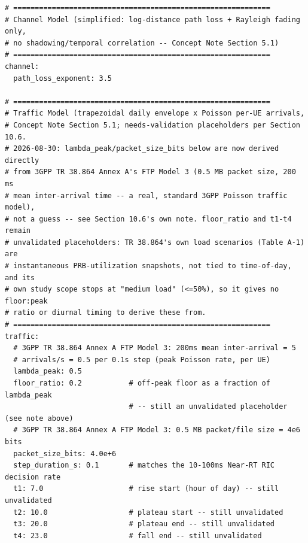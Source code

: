 {\begin{verbatim}
# ============================================================
# Channel Model (simplified: log-distance path loss + Rayleigh fading only,
# no shadowing/temporal correlation -- Concept Note Section 5.1)
# ============================================================
channel:
  path_loss_exponent: 3.5

# ============================================================
# Traffic Model (trapezoidal daily envelope x Poisson per-UE arrivals,
# Concept Note Section 5.1; needs-validation placeholders per Section 10.6.
# 2026-08-30: lambda_peak/packet_size_bits below are now derived directly
# from 3GPP TR 38.864 Annex A's FTP Model 3 (0.5 MB packet size, 200 ms
# mean inter-arrival time -- a real, standard 3GPP Poisson traffic model),
# not a guess -- see Section 10.6's own note. floor_ratio and t1-t4 remain
# unvalidated placeholders: TR 38.864's own load scenarios (Table A-1) are
# instantaneous PRB-utilization snapshots, not tied to time-of-day, and its
# own study scope stops at "medium load" (<=50%), so it gives no floor:peak
# ratio or diurnal timing to derive these from.
# ============================================================
traffic:
  # 3GPP TR 38.864 Annex A FTP Model 3: 200ms mean inter-arrival = 5
  # arrivals/s = 0.5 per 0.1s step (peak Poisson rate, per UE)
  lambda_peak: 0.5
  floor_ratio: 0.2           # off-peak floor as a fraction of lambda_peak
                             # -- still an unvalidated placeholder (see note above)
  # 3GPP TR 38.864 Annex A FTP Model 3: 0.5 MB packet/file size = 4e6 bits
  packet_size_bits: 4.0e+6
  step_duration_s: 0.1       # matches the 10-100ms Near-RT RIC decision rate
  t1: 7.0                    # rise start (hour of day) -- still unvalidated
  t2: 10.0                   # plateau start -- still unvalidated
  t3: 20.0                   # plateau end -- still unvalidated
  t4: 23.0                   # fall end -- still unvalidated


\end{verbatim}}
